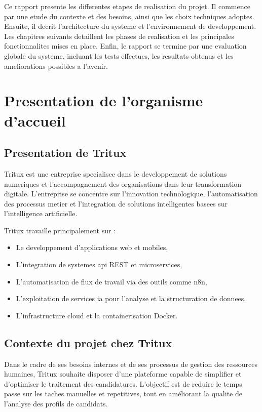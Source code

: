 Ce rapport presente les differentes etapes de realisation du projet. Il commence par une etude du contexte et des besoins, ainsi que les choix techniques adoptes. Ensuite, il decrit l'architecture du systeme et l'environnement de developpement. Les chapitres suivants detaillent les phases de realisation et les principales fonctionnalites mises en place. Enfin, le rapport se termine par une evaluation globale du systeme, incluant les tests effectues, les resultats obtenus et les ameliorations possibles a l'avenir.

\section{Presentation de l'organisme d'accueil}

\subsection{Presentation de Tritux}

Tritux est une entreprise specialisee dans le developpement de solutions numeriques et l'accompagnement des organisations dans leur transformation digitale. L'entreprise se concentre sur l'innovation technologique, l'automatisation des processus metier et l'integration de solutions intelligentes basees sur l'intelligence artificielle.

Tritux travaille principalement sur :
\begin{itemize}
    \item Le developpement d'applications web et mobiles,
    \item L'integration de systemes \acrfull{api} REST et microservices,
    \item L'automatisation de flux de travail via des outils comme n8n,
    \item L'exploitation de services \acrfull{ia} pour l'analyse et la structuration de donnees,
    \item L'infrastructure cloud et la containerisation Docker.
\end{itemize}

\subsection{Contexte du projet chez Tritux}

Dans le cadre de ses besoins internes et de ses processus de gestion des ressources humaines, Tritux souhaite disposer d'une plateforme capable de simplifier et d'optimiser le traitement des candidatures. L'objectif est de reduire le temps passe sur les taches manuelles et repetitives, tout en améliorant la qualite de l'analyse des profils de candidats.

